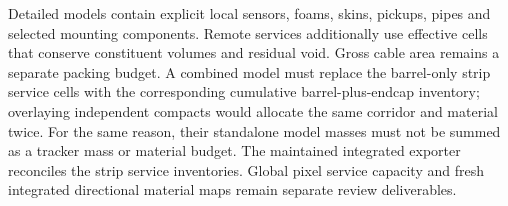 Detailed models contain explicit local sensors, foams, skins, pickups, pipes and
selected mounting components. Remote services additionally use effective cells
that conserve constituent volumes and residual void. Gross cable area remains
a separate packing budget. A combined model must replace the barrel-only strip
service cells with the corresponding cumulative barrel-plus-endcap inventory;
overlaying independent compacts would allocate the same corridor and material
twice. For the same reason, their standalone model masses must not be summed
as a tracker mass or material budget. The maintained integrated exporter reconciles the strip service inventories.
Global pixel service capacity and fresh integrated directional material maps
remain separate review deliverables.
